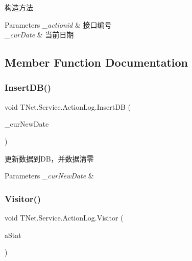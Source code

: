 构造方法 


\begin{DoxyParams}{Parameters}
{\em \+\_\+actionid} & 接口编号\\
\hline
{\em \+\_\+cur\+Date} & 当前日期\\
\hline
\end{DoxyParams}


\subsection{Member Function Documentation}
\mbox{\label{class_t_net_1_1_service_1_1_action_log_ade384532839712937b50312c3a0a5920}} 
\subsubsection{\texorpdfstring{Insert\+D\+B()}{InsertDB()}}
{\footnotesize\ttfamily void T\+Net.\+Service.\+Action\+Log.\+Insert\+DB (\begin{DoxyParamCaption}\item[{Date\+Time}]{\+\_\+cur\+New\+Date }\end{DoxyParamCaption})}



更新数据到\+D\+B，并数据清零 


\begin{DoxyParams}{Parameters}
{\em \+\_\+cur\+New\+Date} & \\
\hline
\end{DoxyParams}
\mbox{\label{class_t_net_1_1_service_1_1_action_log_a49f7ab0ff5ad120f8314f165d771c68b}} 
\subsubsection{\texorpdfstring{Visitor()}{Visitor()}}
{\footnotesize\ttfamily void T\+Net.\+Service.\+Action\+Log.\+Visitor (\begin{DoxyParamCaption}\item[{\mbox{\hyperlink{class_t_net_1_1_service_1_1_game_struct_ac7fb463ce72bdf0b12b015c74d2d58da}{Game\+Struct.\+Log\+Action\+Stat}}}]{a\+Stat }\end{DoxyParamCaption})}



